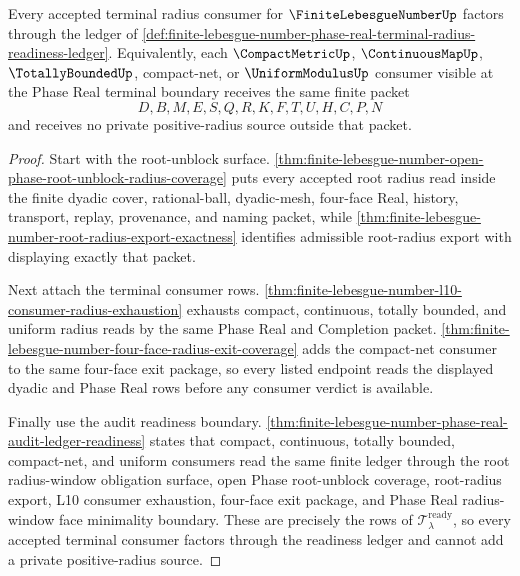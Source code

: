 \begin{theorem}
\label{thm:finite-lebesgue-number-phase-real-terminal-radius-readiness}
Every accepted terminal radius consumer for $\FiniteLebesgueNumberUp$ factors through the ledger of \autoref{def:finite-lebesgue-number-phase-real-terminal-radius-readiness-ledger}. Equivalently, each $\CompactMetricUp$, $\ContinuousMapUp$, $\TotallyBoundedUp$, compact-net, or $\UniformModulusUp$ consumer visible at the Phase Real terminal boundary receives the same finite packet
$$
D,B,M,E,S,Q,R,K,F,T,U,H,C,P,N
$$
and receives no private positive-radius source outside that packet.
\end{theorem}
\begin{proof}
Start with the root-unblock surface. \autoref{thm:finite-lebesgue-number-open-phase-root-unblock-radius-coverage} puts every accepted root radius read inside the finite dyadic cover, rational-ball, dyadic-mesh, four-face Real, history, transport, replay, provenance, and naming packet, while \autoref{thm:finite-lebesgue-number-root-radius-export-exactness} identifies admissible root-radius export with displaying exactly that packet.

Next attach the terminal consumer rows. \autoref{thm:finite-lebesgue-number-l10-consumer-radius-exhaustion} exhausts compact, continuous, totally bounded, and uniform radius reads by the same Phase Real and Completion packet. \autoref{thm:finite-lebesgue-number-four-face-radius-exit-coverage} adds the compact-net consumer to the same four-face exit package, so every listed endpoint reads the displayed dyadic and Phase Real rows before any consumer verdict is available.

Finally use the audit readiness boundary. \autoref{thm:finite-lebesgue-number-phase-real-audit-ledger-readiness} states that compact, continuous, totally bounded, compact-net, and uniform consumers read the same finite ledger through the root radius-window obligation surface, open Phase root-unblock coverage, root-radius export, L10 consumer exhaustion, four-face exit package, and Phase Real radius-window face minimality boundary. These are precisely the rows of $\mathcal{T}_{\lambda}^{\mathrm{ready}}$, so every accepted terminal consumer factors through the readiness ledger and cannot add a private positive-radius source.
\end{proof}

